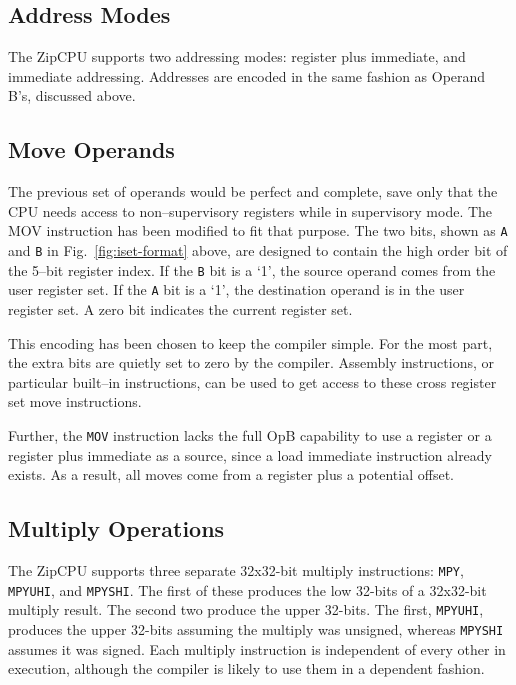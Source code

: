 \documentclass{gqtekspec}
\begin{document}
\subsection{Address Modes}\label{sec:isa-addr}
The ZipCPU supports two addressing modes: register plus immediate, and
immediate addressing.  Addresses are encoded in the same fashion as
Operand B's, discussed above. 

\subsection{Move Operands}\label{sec:isa-mov}
The previous set of operands would be perfect and complete, save only that the
CPU needs access to non--supervisory registers while in supervisory mode.  The
MOV instruction has been modified to fit that purpose.  The two bits,
shown as {\tt A} and {\tt B} in Fig.~\ref{fig:iset-format} above, are designed
to contain the high order bit of the 5--bit register index.  If the {\tt B}
bit is a `1', the source operand comes from the user register set.  If the
{\tt A} bit is a `1', the destination operand is in the user register set.  A
zero bit indicates the current register set.

This encoding has been chosen to keep the compiler simple.  For the most part,
the extra bits are quietly set to zero by the compiler.  Assembly instructions,
or particular built--in instructions, can be used to get access to these
cross register set move instructions.

Further, the {\tt MOV} instruction lacks the full OpB capability to use a
register or a register plus immediate as a source, since a load immediate
instruction already exists.  As a result, all moves come from a register plus a 
potential offset.

\subsection{Multiply Operations}\label{sec:isa-mpy}

The ZipCPU supports three separate 32x32-bit multiply
instructions: {\tt MPY}, {\tt MPYUHI}, and {\tt MPYSHI}.  The first of these
produces the low 32-bits of a 32x32-bit multiply result.  The second two
produce the upper 32-bits.  The first, {\tt MPYUHI}, produces the upper 32-bits
assuming the multiply was unsigned, whereas {\tt MPYSHI} assumes it was signed.
Each multiply instruction is independent of every other in execution, although
the compiler is likely to use them in a dependent fashion.
\end{document}
